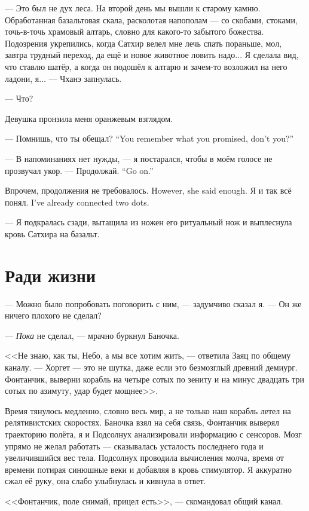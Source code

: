--- Это был не дух леса.
На второй день мы вышли к старому камню.
Обработанная базальтовая скала, расколотая напополам --- со скобами, стоками, точь-в-точь храмовый алтарь, словно для какого-то забытого божества.
Подозрения укрепились, когда Сатхир велел мне лечь спать пораньше, мол, завтра трудный переход, да ещё и новое
животное ловить надо...
Я сделала вид, что ставлю шатёр, а когда он подошёл к алтарю и зачем-то возложил на него ладони, я... --- Чханэ запнулась.

--- Что?

Девушка пронзила меня оранжевым взглядом.

{--- Помнишь, что ты обещал?}
{``You remember what you promised, don't you?''}

--- В напоминаниях нет нужды, --- я постарался, чтобы в моём голосе не прозвучал укор.
{--- Продолжай.}
{``Go on.''}

{Впрочем, продолжения не требовалось.}
{However, she said enough.}
{Я и так всё понял.}
{I've already connected two dots.}

--- Я подкралась сзади, вытащила из ножен его ритуальный нож и выплеснула кровь Сатхира на базальт.

\section{Ради жизни}

--- Можно было попробовать поговорить с ним, --- задумчиво сказал я.
--- Он же ничего плохого не сделал?

--- \emph{Пока} не сделал, --- мрачно буркнул Баночка.

<<Не знаю, как ты, Небо, а мы все хотим жить, --- ответила Заяц по общему каналу.
--- Хоргет --- это не шутка, даже если это безмозглый древний демиург.
Фонтанчик, выверни корабль на четыре сотых по зениту и на минус двадцать три сотых по азимуту, удар будет мощнее>>.

Время тянулось медленно, словно весь мир, а не только наш корабль летел на релятивистских скоростях.
Баночка взял на себя связь, Фонтанчик выверял траекторию полёта, я и Подсолнух анализировали информацию с сенсоров.
Мозг упрямо не желал работать --- сказывалась усталость последнего года и увеличившийся вес тела.
Подсолнух проводила вычисления молча, время от времени потирая синюшные веки и добавляя в кровь стимулятор.
Я аккуратно сжал её руку, она слабо улыбнулась и кивнула в ответ.

<<Фонтанчик, поле снимай, прицел есть>>, --- скомандовал общий канал.

